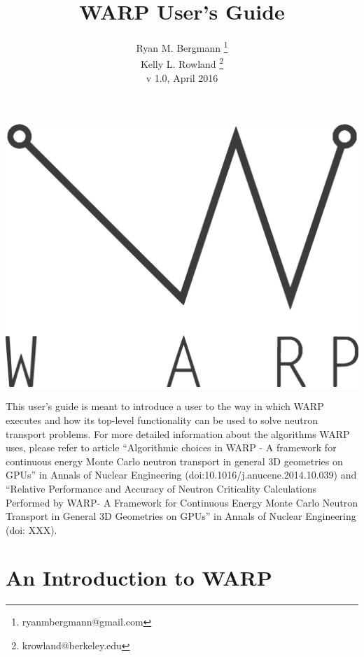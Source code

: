 \documentclass[twoside,a4paper]{refart}
\title{WARP User's Guide}
\author{Ryan M. Bergmann \thanks{ryanmbergmann@gmail.com} \\
Kelly L. Rowland \thanks{krowland@berkeley.edu}\\
v 1.0,  April 2016}
\date{}
\begin{document}
\maketitle

%
%

\includegraphics[width=\linewidth]{graphics/warp-vec.eps}

\vspace*{\fill} %

This user's guide is meant to introduce a user to the way in which WARP executes and how its top-level 
functionality can be used to solve neutron transport problems.  For more detailed information about the 
algorithms WARP uses, please refer to article ``Algorithmic choices in WARP - A framework for continuous 
energy Monte Carlo neutron transport in general 3D geometries on GPUs'' in Annals of Nuclear Engineering 
(doi:10.1016/j.anucene.2014.10.039) and ``Relative Performance and Accuracy of Neutron Criticality Calculations Performed by WARP- A Framework for Continuous Energy Monte Carlo Neutron Transport in General 3D Geometries on GPUs'' in Annals of Nuclear Engineering (doi: XXX).

\vfill


\newpage
\tableofcontents
\newpage



\section{An Introduction to WARP}
\end{document}
